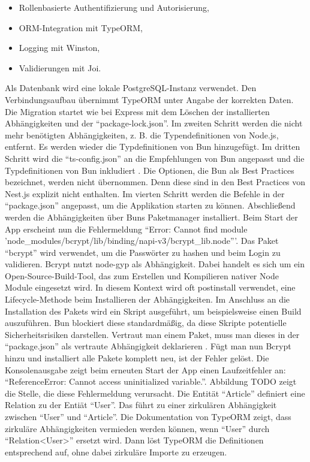 {\begin{itemize}
	\item Rollenbasierte Authentifizierung und Autorisierung,
	\item ORM-Integration mit TypeORM,
	\item Logging mit Winston,
	\item Validierungen mit Joi.
\end{itemize}

\noindent
Als Datenbank wird eine lokale PostgreSQL-Instanz verwendet. Den Verbindungsaufbau übernimmt TypeORM unter Angabe der korrekten Daten. Die Migration startet wie bei Express mit dem Löschen der installierten Abhängigkeiten und der ``package-lock.json''. Im zweiten Schritt werden die nicht mehr benötigten Abhängigkeiten, z. B. die Typendefinitionen von Node.js, entfernt. Es werden wieder die Typdefinitionen von Bun hinzugefügt. Im dritten Schritt wird die ``ts-config.json'' an die Empfehlungen von Bun angepasst und die Typdefinitionen von Bun inkludiert \cite{OvenSh.2023}. Die Optionen, die Bun als Best Practices bezeichnet, werden nicht übernommen. Denn diese sind in den Best Practices von Nest.js explizit nicht enthalten. Im vierten Schritt werden die Befehle in der ``package.json'' angepasst, um die Applikation starten zu können. Abschließend werden die Abhängigkeiten über Buns Paketmanager installiert.\newline
Beim Start der App erscheint nun die Fehlermeldung ``Error: Cannot find module 'node\_modules/bcrypt/lib/binding/napi-v3/bcrypt\_lib.node'''. Das Paket ``bcrypt'' wird verwendet, um die Passwörter zu hashen und beim Login zu validieren. Bcrypt nutzt node-gyp als Abhängigkeit. Dabei handelt es sich um ein Open-Source-Build-Tool, das zum Erstellen und Kompilieren nativer Node Module eingesetzt wird. In diesem Kontext wird oft postinstall verwendet, eine Lifecycle-Methode beim Installieren der Abhängigkeiten. Im Anschluss an die Installation des Pakets wird ein Skript ausgeführt, um beispielsweise einen Build auszuführen. Bun blockiert diese standardmäßig, da diese Skripte potentielle Sicherheitsrisiken darstellen. Vertraut man einem Paket, muss man dieses in der ``package.json'' als vertraute Abhängigkeit deklarieren . Fügt man nun Bcrypt hinzu und installiert alle Pakete komplett neu, ist der Fehler gelöst. \newline
Die Konsolenausgabe zeigt beim erneuten Start der App einen Laufzeitfehler an: ``ReferenceError: Cannot access uninitialized variable.''. Abbildung TODO zeigt die Stelle, die diese Fehlermeldung verursacht. Die Entität ``Article'' definiert eine Relation zu der Entiät ``User''. Das führt zu einer zirkulären Abhängigkeit zwischen ``User'' und ``Article''. Die Dokumentation von TypeORM zeigt, dass zirkuläre Abhängigkeiten vermieden werden können, wenn ``User'' durch ``Relation<User>'' ersetzt wird. Dann löst TypeORM die Definitionen entsprechend auf, ohne dabei zirkuläre Importe zu erzeugen. \\

}

